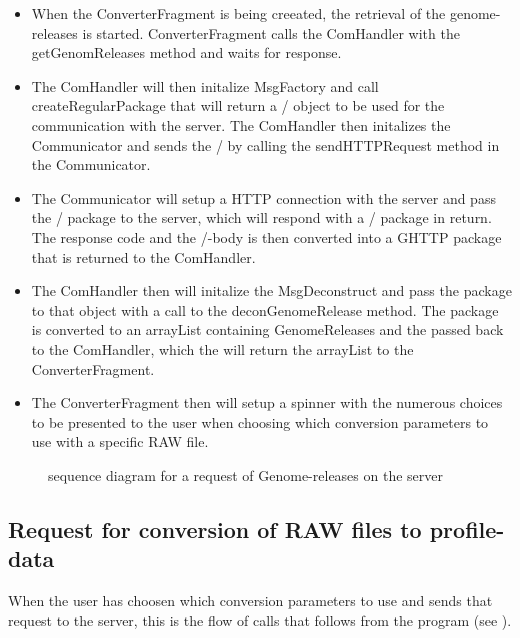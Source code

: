     \begin{itemize}
    	
        \item
        	When the ConverterFragment is being creeated, the retrieval of the genome-releases is started. ConverterFragment calls the ComHandler with the getGenomReleases method and waits for response.
       	\item
        	The ComHandler will then initalize MsgFactory and call createRegularPackage that will return a \json/ object to be used for the communication with the server. The ComHandler then initalizes the Communicator and sends the \json/ by calling the sendHTTPRequest method in the Communicator.
      	\item
        	The Communicator will setup a HTTP connection with the server and pass the \json/ package to the server, which will respond with a \json/ package in return. The response code and the \json/-body is then converted into a GHTTP package that is returned to the ComHandler.
       	\item
        	The ComHandler then will initalize the MsgDeconstruct and pass the package to that object with a call to the deconGenomeRelease method. The package is converted to an arrayList containing GenomeReleases and the passed back to the ComHandler, which the will return the arrayList to the ConverterFragment.
      	\item
        	The ConverterFragment then will setup a spinner with the numerous choices to be presented to the user when choosing which conversion parameters to use with a specific RAW file.
    
    \end{itemize}
    
    \begin{figure}
        \caption{sequence diagram for a request of Genome-releases on the server}
        \label{fig:and_genomeseq}
    \end{figure}
\FloatBarrier

    
\subsection{Request for conversion of RAW files to profile-data}
	When the user has choosen which conversion parameters to use and sends that request to the server, this is the flow of calls that follows from the program (see ).
    
